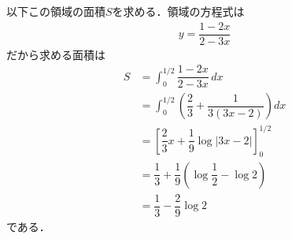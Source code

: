\documentclass[../../main.tex]{subfiles}
\begin{document}
以下この領域の面積$S$を求める．領域の方程式は
\begin{align}
  y = \dfrac{1-2x}{2-3x}
\end{align}
だから求める面積は
\begin{align}
  S
  &=\int_0^{1/2}\dfrac{1-2x}{2-3x}\,dx \\
  &=\int_0^{1/2}\left(\dfrac{2}{3}+\dfrac{1}{3(3x-2)}\right)dx \\
  &=\left[\dfrac{2}{3}x+\dfrac{1}{9}\log|3x-2|\right]_0^{1/2} \\
  &=\dfrac{1}{3}+\dfrac{1}{9}\left(\log\dfrac{1}{2}-\log2 \right)\\
  &=\dfrac{1}{3}-\dfrac{2}{9}\log2
\end{align}
である．

\newpage
\end{document}
